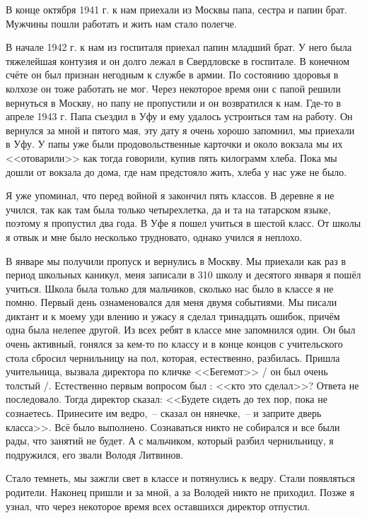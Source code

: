 В конце октября 1941 г. к нам приехали из Москвы папа, сестра и папин брат. Мужчины пошли работать и жить нам стало полегче.

В начале 1942 г. к нам из госпиталя приехал папин младший брат. У него была тяжелейшая контузия и он долго лежал в Свердловске в госпитале. В конечном счёте он был признан негодным к службе в армии. По состоянию здоровья в колхозе он тоже работать не мог. Через некоторое время они с папой решили вернуться в Москву, но папу не пропустили и он возвратился к нам. Где-то в апреле 1943 г. Папа съездил в Уфу и ему удалось устроиться там на работу. Он вернулся за мной и пятого мая, эту дату я очень хорошо запомнил, мы приехали в Уфу. У папы уже были продовольственные карточки и около вокзала мы их <<отоварили>> как тогда говорили, купив пять килограмм хлеба. Пока мы дошли от вокзала до дома, где нам предстояло жить, хлеба у нас уже не было.

Я уже упоминал, что перед войной я закончил пять классов. В деревне я не учился, так как там была только четырехлетка, да и та на татарском языке, поэтому я пропустил два года. В Уфе я пошел учиться в шестой класс. От школы я отвык и мне было несколько трудновато, однако учился я неплохо.

В январе мы получили пропуск и вернулись в Москву. Мы приехали как раз в период школьных каникул, меня записали в 310 школу и десятого января я пошёл учиться. Школа была только для мальчиков, сколько нас было в классе я не помню. Первый день ознаменовался для меня двумя событиями. Мы писали диктант и к моему уди влению и ужасу я сделал тринадцать ошибок, причём одна была нелепее другой. Из всех ребят в классе мне запомнился один. Он был очень активный, гонялся за кем-то по классу и в конце концов с учительского стола сбросил чернильницу на пол, которая, естественно, разбилась. Пришла учительница, вызвала директора по кличке <<Бегемот>> / он был очень толстый /. Естественно первым вопросом был : <<кто это сделал>>? Ответа не последовало. Тогда директор сказал: <<Будете сидеть до тех пор, пока не сознаетесь. Принесите им ведро,~-- сказал он нянечке,~-- и заприте дверь класса>>. Всё было выполнено. Сознаваться никто не собирался и все были рады, что занятий не будет. А с мальчиком, который разбил чернильницу, я подружился, его звали Володя Литвинов.

Стало темнеть, мы зажгли свет в классе и потянулись к ведру. Стали появляться родители. Наконец пришли и за мной, а за Володей никто не приходил. Позже я узнал, что через некоторое время всех оставшихся директор отпустил.

